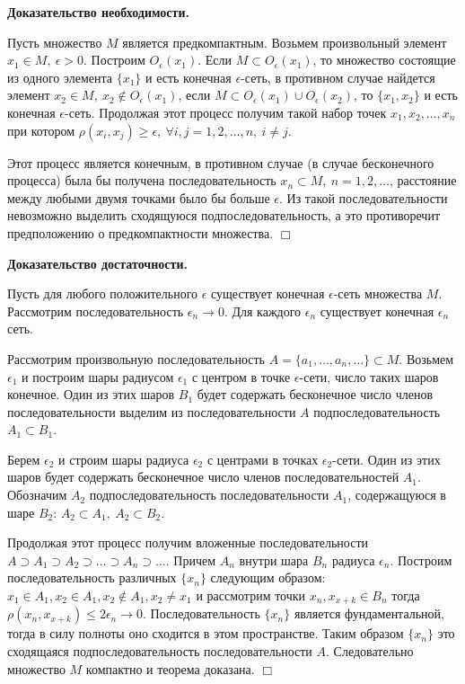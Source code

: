 \documentclass[12pt]{report}
\renewcommand{\[}{$\\\displaystyle}
\renewcommand{\]}{\\$}
\renewcommand{\[}{$\\\displaystyle}
\newcommand{\sep}{,\ }
\newcommand{\btev}[1][]{\textbf{Доказательство#1.}
}
\newcommand{\etev}{$\Box$}
\begin{document}
\btev[ необходимости]
  Пусть множество $M$ является предкомпактным. Возьмем произвольный элемент $x_1 \in M\sep \epsilon > 0$.
  Построим $O_{\epsilon}(x_1)$. Если $M \subset O_{\epsilon}(x_1)$, то множество состоящие из одного элемента $\{x_1\}$ и есть конечная $\epsilon$-сеть, в противном случае найдется элемент $x_2 \in M\sep x_2 \not\in O_\epsilon(x_1)$, если $M\subset O_\epsilon(x_1)\cup O_\epsilon(x_2)$, то $\{x_1,x_2\}$ и есть конечная $\epsilon$-сеть. Продолжая этот процесс получим такой набор точек $x_1, x_2,\dots,x_n$ при котором $\rho(x_i,x_j)\geq \epsilon\sep \forall i,j=1,2,\dots,n\sep i\neq j$.

  Этот процесс является конечным, в противном случае (в случае бесконечного процесса) была бы получена последовательность ${x_n}\subset M\sep n=1,2,\dots$, расстояние между любыми двумя точками было бы больше $\epsilon$. Из такой последовательности невозможно выделить сходящуюся подпоследовательность, а это противоречит предположению о предкомпактности множества.
\etev

\btev[ достаточности]
  Пусть для любого положительного $\epsilon$ существует конечная $\epsilon$-сеть множества $M$. Рассмотрим последовательность $\epsilon_n \rightarrow 0$. Для каждого $\epsilon_n$ существует конечная $\epsilon_n$ сеть.

  Рассмотрим произвольную последовательность $A=\{a_{1},\dots,a_n,\dots\}\subset M$. Возьмем $\epsilon_1$ и построим шары радиусом $\epsilon_1$ с центром в точке $\epsilon$-сети, число таких шаров конечное. Один из этих шаров $B_1$ будет содержать бесконечное число членов последовательности выделим из последовательности $A$ подпоследовательность $A_1\subset B_1$.

  Берем $\epsilon_2$ и строим шары радиуса $\epsilon_2$ с центрами в точках $\epsilon_2$-сети. Один из этих шаров будет содержать бесконечное число членов последовательностей $A_1$. Обозначим $A_2$ подпоследовательность последовательности $A_1$, содержащуюся в шаре $B_2$: $A_2\subset A_1\sep A_2\subset B_2$.

  Продолжая этот процесс получим вложенные последовательности $A\supset A_1\supset A_2\supset \dots\supset A_n\supset \dots$. Причем $A_n$ внутри шара $B_n$ радиуса $\epsilon_n$. Построим последовательность различных $\{x_n\}$ следующим образом: $x_1 \in A_1, x_2 \in A_1, x_2 \not\in A_1, x_2 \neq x_1$ и рассмотрим точки $x_n, x_{x+k} \in B_n$ тогда $\rho(x_n,x_{x+k})\leq 2 \epsilon_n \rightarrow 0$. Последовательность $\{x_n\}$ является фундаментальной, тогда в силу полноты оно сходится в этом пространстве. Таким образом $\{x_n\}$ это сходящаяся подпоследовательность последовательности $A$. Следовательно множество $M$ компактно и теорема доказана.
\etev
\end{document}
